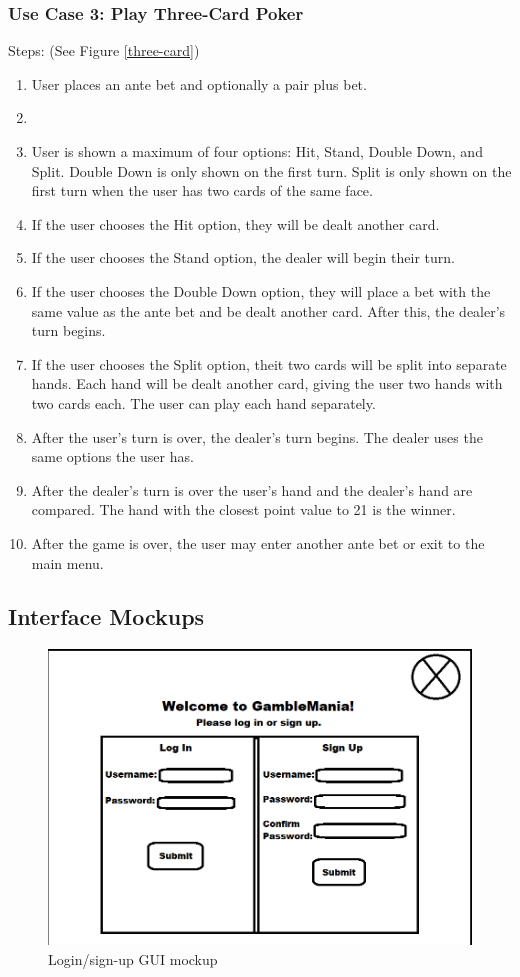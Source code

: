 \documentclass[10pt,conference,onecolumn,compsoc]{IEEEtran}
\begin{document}
\subsubsection{Use Case 3: Play Three-Card Poker}
Steps: (See Figure \ref{three-card})
\begin{enumerate}
\item User places an ante bet and optionally a pair plus bet.
\item 
\item User is shown a maximum of four options: Hit, Stand, Double Down, and Split. Double Down is only shown on the first turn. Split is only shown on the first turn when the user has two cards of the same face.
\item If the user chooses the Hit option, they will be dealt another card.
\item If the user chooses the Stand option, the dealer will begin their turn.
\item If the user chooses the Double Down option, they will place a bet with the same value as the ante bet and be dealt another card. After this, the dealer's turn begins.
\item If the user chooses the Split option, theit two cards will be split into separate hands. Each hand will be dealt another card, giving the user two hands with two cards each. The user can play each hand separately.
\item After the user's turn is over, the dealer's turn begins. The dealer uses the same options the user has.
\item After the dealer's turn is over the user's hand and the dealer's hand are compared. The hand with the closest point value to 21 is the winner.
\item After the game is over, the user may enter another ante bet or exit to the main menu.
\end{enumerate}

\subsection{Interface Mockups}

\begin{figure}[h]
\caption{Login/sign-up GUI mockup}
\includegraphics[scale=0.4]{login}
\centering
\end{figure}
\end{document}

